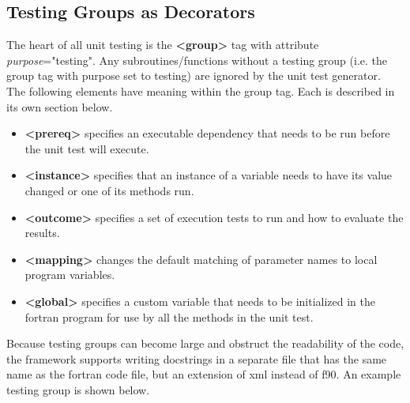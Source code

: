 \documentclass[paper=a4, fontsize=11pt]{scrartcl} %
\numberwithin{equation}{section} %
\numberwithin{figure}{section} %
\numberwithin{table}{section} %
\begin{document}
\subsection{Testing Groups as Decorators}

The heart of all unit testing is the \textbf{<group>} tag with attribute \textit{purpose}="testing".
Any subroutines/functions without a testing group (i.e. the group tag with purpose set to testing) are ignored
by the unit test generator. \\

The following elements have meaning within the group tag. Each is described in its own section below.

\begin{itemize}
\item \textbf{<prereq>} specifies an executable dependency that needs to be run before the unit test will execute.
\item \textbf{<instance>} specifies that an instance of a variable needs to have its value changed or one of its methods run.
\item \textbf{<outcome>} specifies a set of execution tests to run and how to evaluate the results.
\item \textbf{<mapping>} changes the default matching of parameter names to local program variables.
\item \textbf{<global>} specifies a custom variable that needs to be initialized in the fortran program for use by
all the methods in the unit test.
\end{itemize}

Because testing groups can become large and obstruct the readability of the code, the framework supports writing
docstrings in a separate file that has the same name as the fortran code file, but an extension of xml instead
of f90. An example testing group is shown below.
\end{document}
